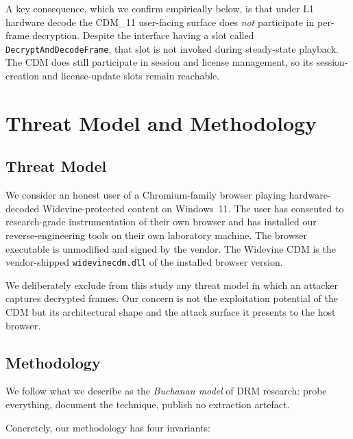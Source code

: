 \documentclass[11pt,letterpaper]{article}
\begin{document}
A key consequence, which we confirm empirically below, is that under
L1 hardware decode the CDM\_11 user-facing surface does \emph{not}
participate in per-frame decryption.  Despite the interface having a
slot called \texttt{DecryptAndDecodeFrame}, that slot is not invoked
during steady-state playback.  The CDM does still participate in
session and license management, so its session-creation and
license-update slots remain reachable.

\section{Threat Model and Methodology}
\label{sec:threat}

\subsection{Threat Model}

We consider an honest user of a Chromium-family browser playing
hardware-decoded Widevine-protected content on Windows~11.  The user
has consented to research-grade instrumentation of their own browser
and has installed our reverse-engineering tools on their own
laboratory machine.  The browser executable is unmodified and signed
by the vendor.  The Widevine CDM is the vendor-shipped
\texttt{widevinecdm.dll} of the installed browser version.

We deliberately exclude from this study any threat model in which an
attacker captures decrypted frames.  Our concern is not the
exploitation potential of the CDM but its architectural shape and the
attack surface it presents to the host browser.

\subsection{Methodology}

We follow what we describe as the \emph{Buchanan model} of DRM
research: probe everything, document the technique, publish no
extraction artefact.

Concretely, our methodology has four invariants:
\end{document}
